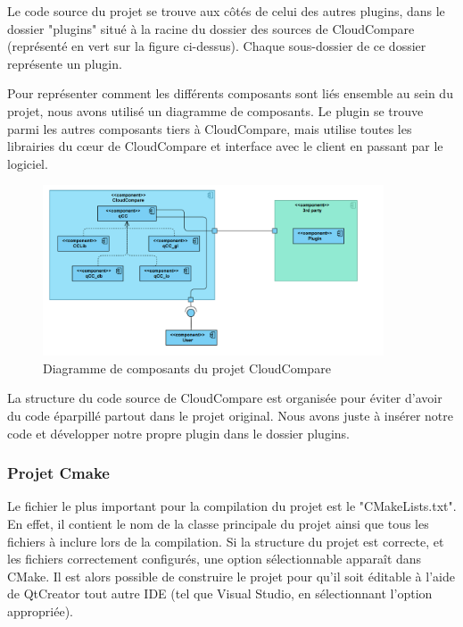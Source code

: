 \documentclass[12pt,titlepage,french]{article}
\begin{document}
Le code source du projet se trouve aux côtés de celui des autres plugins, dans le dossier "plugins" situé à la racine du dossier des sources de CloudCompare (représenté en vert sur la figure ci-dessus). Chaque sous-dossier de ce dossier représente un plugin. \newline

Pour représenter comment les différents composants sont liés ensemble au sein du projet, nous avons utilisé un diagramme de composants. Le plugin se trouve parmi les autres composants tiers à CloudCompare, mais utilise toutes les librairies du cœur de CloudCompare et interface avec le client en passant par le logiciel.

\begin{figure}[H]
\center
  \includegraphics[width=0.9\textwidth]{./img/component_diagr.png}
  \caption{\label{} Diagramme de composants du projet CloudCompare}
\end{figure}

La structure du code source de CloudCompare est organisée pour éviter d'avoir du code éparpillé partout dans le projet original. Nous avons juste à insérer notre code et développer notre propre plugin dans le dossier plugins.

\subsubsection{Projet Cmake}

Le fichier le plus important pour la compilation du projet est le "CMakeLists.txt". En effet, il contient le nom de la classe principale du projet ainsi que tous les fichiers à inclure lors de la compilation.
Si la structure du projet est correcte, et les fichiers correctement configurés, une option sélectionnable apparaît dans CMake.
Il est alors possible de construire le projet pour qu'il soit éditable à l'aide de QtCreator tout autre IDE (tel que Visual Studio, en sélectionnant l'option appropriée).
\end{document}
